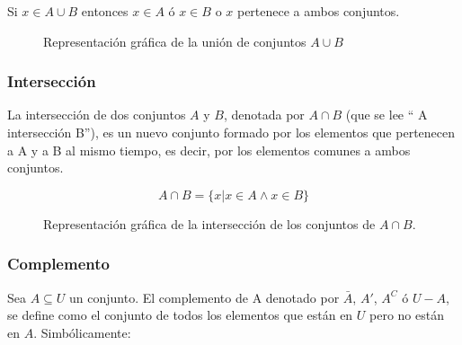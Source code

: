 Si $x \in A \cup B $ entonces $x \in A $ ó $x \in B$ o $x$ pertenece a ambos
conjuntos.

\begin{figure}[h]
    \centering
    \caption{Representación gráfica de la unión de conjuntos $A \cup B$}
    \label{fig:unionConjuntos}
\end{figure}

\subsubsection{Intersección}

La intersección de dos conjuntos $A$ y $B$, denotada por $A \cap B$ (que se lee
“ A intersección B”), es un nuevo conjunto formado por los elementos que
pertenecen a A y a B al mismo tiempo, es decir, por los elementos comunes a
ambos conjuntos.

\begin{equation}
    A \cap B=\{x | x \in A \wedge x \in B\}
\end{equation}

\begin{figure}[h]
    \centering
    \caption{Representación gráfica de la intersección de los conjuntos de $A \cap B$.}
    \label{fig:interseccionConjuntos}
\end{figure}

\subsubsection{Complemento}

Sea $A \subseteq U$ un conjunto. El complemento de A denotado por $\bar{A}$,
$A'$, $A^C$ ó $U-A$, se define como el conjunto de todos los elementos que están
en $U$ pero no están en $A$. Simbólicamente:

